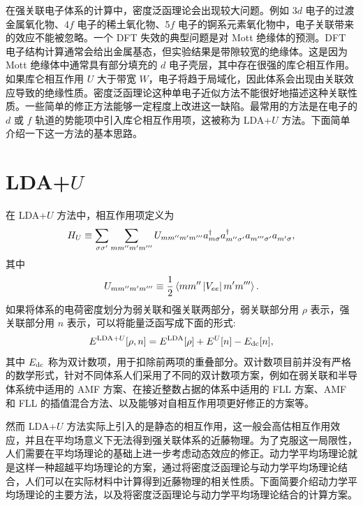 在强关联电子体系的计算中，密度泛函理论会出现较大问题。例如 3$d$ 电子的过渡金属氧化物、4$f$ 电子的稀土氧化物、5$f$ 电子的锕系元素氧化物中，电子关联带来的效应不能被忽略。一个 DFT 失效的典型问题是对 Mott 绝缘体的预测。DFT 电子结构计算通常会给出金属基态，但实验结果是带隙较宽的绝缘体。这是因为 Mott 绝缘体中通常具有部分填充的 $d$ 电子壳层，其中存在很强的库仑相互作用。如果库仑相互作用 $U$ 大于带宽 $W$，电子将趋于局域化，因此体系会出现由关联效应导致的绝缘性质。密度泛函理论这种单电子近似方法不能很好地描述这种关联性质。一些简单的修正方法能够一定程度上改进这一缺陷。最常用的方法是在电子的 $d$ 或 $f$ 轨道的势能项中引入库仑相互作用项，这被称为 LDA+$U$ 方法。下面简单介绍一下这一方法的基本思路。
\section{LDA+$U$}
在 LDA+$U$ 方法中，相互作用项定义为 
\begin{equation}
    H_U\equiv \sum_{\sigma\sigma'}\sum_{mm''m'm'''}U_{mm''m'm'''}a_{m\sigma}^\dagger a_{m''\sigma'}^\dagger a_{m'''\sigma'}^{ }a_{m'\sigma}^{ },
\end{equation}
其中 
\begin{equation}
    U_{mm''m'm'''}\equiv \frac{1}{2}\left\langle mm''\left| V_{ee} \right| m'm''' \right\rangle.
\end{equation}
如果将体系的电荷密度划分为弱关联和强关联两部分，弱关联部分用 $\rho$ 表示，强关联部分用 $n$ 表示，可以将能量泛函写成下面的形式:
\begin{equation}
    E^{\mathrm{LDA}+U}[\rho,n]=E^{\mathrm{LDA}}[\rho]+E^{U}[n]-E_{\mathrm{dc}}[n],
\end{equation}
其中 $E_{\mathrm{dc}}$ 称为双计数项，用于扣除前两项的重叠部分。双计数项目前并没有严格的数学形式，针对不同体系人们采用了不同的双计数项方案，例如在弱关联和半导体系统中适用的 AMF 方案\cite{PhysRevB.44.943,PhysRevB.49.14211}、在接近整数占据的体系中适用的 FLL 方案\cite{PhysRevB.48.16929}、AMF 和 FLL 的插值混合方法\cite{PhysRevB.67.153106}、以及能够对自相互作用项更好修正的方案\cite{PhysRevB.76.033102}等。

然而 LDA+$U$ 方法实际上引入的是静态的相互作用，这一般会高估相互作用效应，并且在平均场意义下无法得到强关联体系的近藤物理。为了克服这一局限性，人们需要在平均场理论的基础上进一步考虑动态效应的修正。动力学平均场理论就是这样一种超越平均场理论的方案，通过将密度泛函理论与动力学平均场理论结合，人们可以在实际材料中计算得到近藤物理的相关性质。下面简要介绍动力学平均场理论的主要方法，以及将密度泛函理论与动力学平均场理论结合的计算方案。
